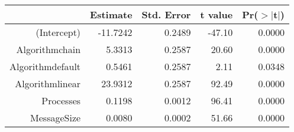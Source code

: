 \begin{tabular}{rrrrr}
  \hline
 & Estimate & Std. Error & t value & Pr($>$$|$t$|$) \\ 
  \hline
(Intercept) & -11.7242 & 0.2489 & -47.10 & 0.0000 \\ 
  Algorithmchain & 5.3313 & 0.2587 & 20.60 & 0.0000 \\ 
  Algorithmdefault & 0.5461 & 0.2587 & 2.11 & 0.0348 \\ 
  Algorithmlinear & 23.9312 & 0.2587 & 92.49 & 0.0000 \\ 
  Processes & 0.1198 & 0.0012 & 96.41 & 0.0000 \\ 
  MessageSize & 0.0080 & 0.0002 & 51.66 & 0.0000 \\ 
   \hline
\end{tabular}
